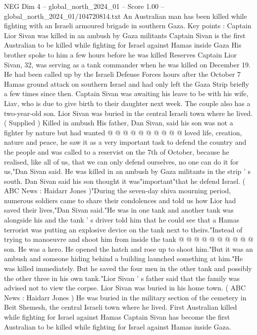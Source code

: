 \begin{textsample}{NEG Dim 4 – global\_north\_2024\_01 – Score 1.00 – global\_north\_2024\_01/104720814.txt}  \label{ex:f4_neg_125}
An Australian man has been killed while fighting with an Israeli armoured brigade in southern Gaza.
Key points : Captain Lior Sivan was killed in an ambush by Gaza militants Captain Sivan is the first Australian to be killed while fighting for Israel against Hamas inside Gaza His brother spoke to him a few hours before he was killed Reserves Captain Lior Sivan, 32, was serving as a tank commander when he was killed on December 19.
He had been called up by the Israeli Defense Forces hours after the October 7 Hamas ground attack on southern Israel and had only left the Gaza Strip briefly a few times since then.
Captain Sivan was awaiting his leave to be with his wife, Liav, who is due to give birth to their daughter next week.
The couple also has a two-year-old son.
Lior Sivan was buried in the central Israeli town where he lived. ( Supplied ) Killed in ambush His father, Dan Sivan, said his son was not a fighter by nature but had wanted @ @ @ @ @ @ @ @ @ @ loved life, creation, nature and peace, he saw it as a very important task to defend the country and the people and was called to a reservist on the 7th of October, because he realised, like all of us, that we can only defend ourselves, no one can do it for us,"Dan Sivan said.
He was killed in an ambush by Gaza militants in the strip ' s south.
Dan Sivan said his son thought it was"important"that he defend Israel. ( ABC News : Haidarr Jones )"During the seven-day shiva mourning period, numerous soldiers came to share their condolences and told us how Lior had saved their lives,"Dan Sivan said."He was in one tank and another tank was alongside his and the tank ' s driver told him that he could see that a Hamas terrorist was putting an explosive device on the tank next to theirs."Instead of trying to manoeuvre and shoot him from inside the tank @ @ @ @ @ @ @ @ @ @ son.
He was a hero.
He opened the hatch and rose up to shoot him."But it was an ambush and someone hiding behind a building launched something at him."He was killed immediately.
But he saved the four men in the other tank and possibly the other three in his own tank."Lior Sivan ' s father said that the family was advised not to view the corpse.
Lior Sivan was buried in his home town. ( ABC News : Haidarr Jones ) He was buried in the military section of the cemetery in Beit Shemesh, the central Israeli town where he lived.
First Australian killed while fighting for Israel against Hamas Captain Sivan has become the first Australian to be killed while fighting for Israel against Hamas inside Gaza.

\end{textsample}
